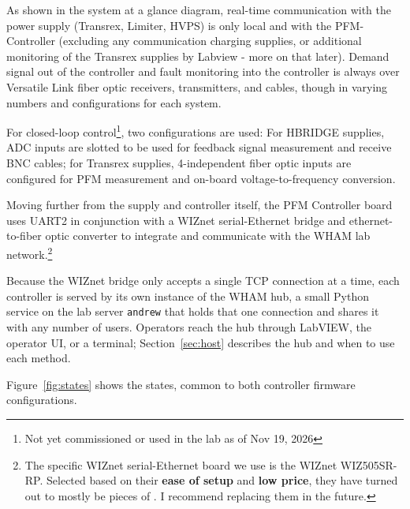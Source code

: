 \documentclass[11pt]{article}
\begin{document}
As shown in the system at a glance diagram, real-time communication with the power supply (Transrex, Limiter, HVPS) is only local and with the PFM-Controller (excluding any communication charging supplies, or additional monitoring of the Transrex supplies by Labview - more on that later). Demand signal out of the controller and fault monitoring into the controller is always over Versatile Link fiber optic receivers, transmitters, and cables, though in varying numbers and configurations for each system. 

For closed-loop control\footnote{Not yet commissioned or used in the lab as of Nov 19, 2026}, two configurations are used: For HBRIDGE supplies, ADC inputs are slotted to be used for feedback signal measurement and receive BNC cables; for Transrex supplies, 4-independent fiber optic inputs are configured for PFM measurement and on-board voltage-to-frequency conversion.

Moving further from the supply and controller itself, the PFM Controller board uses UART2 in conjunction with a WIZnet serial-Ethernet bridge and ethernet-to-fiber optic converter to integrate and communicate with the WHAM lab network.\footnote{The specific WIZnet serial-Ethernet board we use is the WIZnet WIZ505SR-RP. Selected based on their \textbf{ease of setup} and \textbf{low price}, they have turned out to mostly be pieces of \textasteriskcentered\textasteriskcentered\textasteriskcentered\textasteriskcentered. I recommend replacing them in the future.}

Because the WIZnet bridge only accepts a single TCP connection at a time, each controller is served by its own instance of the WHAM hub, a small Python service on the lab server \texttt{andrew} that holds that one connection and shares it with any number of users. Operators reach the hub through LabVIEW, the operator UI, or a terminal; Section~\ref{sec:host} describes the hub and when to use each method.

Figure~\ref{fig:states} shows the states, common to both controller firmware configurations.
\end{document}
